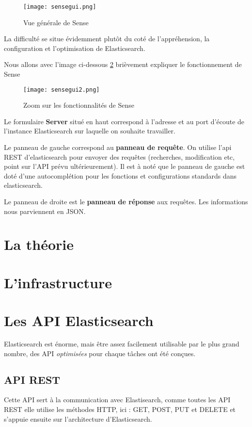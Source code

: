 \begin{figure}[H]
\center
\texttt{[image: sensegui.png]}
\label{fig:sensegui.png}
\caption{Vue générale de Sense}
\end{figure}

La difficulté se situe évidemment plutôt du coté de l'appréhension, la configuration
et l'optimisation de Elasticsearch.

Nous allons avec l'image ci-dessous \ref{fig:sensegui2.png} brièvement expliquer le fonctionnement de Sense
\begin{figure}[H]
\center
\texttt{[image: sensegui2.png]}
\label{fig:sensegui2.png}
\caption{Zoom sur les fonctionnalités de Sense}
\end{figure}
Le formulaire \textbf{Server} situé en haut correspond à l'adresse et au port d'écoute 
de l'instance Elasticsearch sur laquelle on souhaite travailler.

Le panneau de gauche correspond au \textbf{panneau de requête}. On utilise l'api REST d'elasticsearch
pour envoyer des requêtes (recherches, modification etc, point sur l'API prévu 
ultérieurement). Il est à noté que le panneau de gauche est doté d'une autocomplétion
pour les fonctions et configurations standards dans elasticsearch.

Le panneau de droite est le \textbf{panneau de réponse} aux requêtes. Les informations
nous parviennent en JSON.

\section{La théorie}

\section{L'infrastructure}

\section{Les API Elasticsearch}
Elasticsearch est énorme, mais être assez facilement utilisable par le 
plus grand nombre, des \gls{API} \emph{optimisées} pour chaque tâches ont été conçues.

\subsection{API REST}
Cette API sert à la communication avec Elastisearch, comme toutes les API REST elle
utilise les méthodes HTTP, ici : GET, POST, PUT et DELETE et s'appuie ensuite sur l'architecture d'Elasticsearch.


